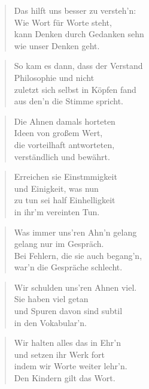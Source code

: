 \documentclass[10pt,a4paper]{article}
\begin{document}
\begin{multicols}{2}
\begin{verse}
Das hilft uns besser zu versteh’n: \\
Wie Wort für Worte steht, \\
kann Denken durch Gedanken sehn \\
wie unser Denken geht. \\
\end{verse}

\begin{verse}
So kam es dann, dass der Verstand \\
Philosophie und nicht \\
zuletzt sich selbst in Köpfen fand \\
aus den’n die Stimme spricht. \\
\end{verse}

\begin{verse}
Die Ahnen damals horteten \\
Ideen von großem Wert, \\
die vorteilhaft antworteten, \\
verständlich und bewährt. \\
\end{verse}

\begin{verse}
Erreichen sie Einstmmigkeit \\
und Einigkeit, was nun \\
zu tun sei half Einhelligkeit \\
in ihr’m vereinten Tun. \\
\end{verse}

\begin{verse}
Was immer uns’ren Ahn’n gelang \\
gelang nur im Gespräch. \\
Bei Fehlern, die sie auch begang’n, \\
war’n die Gespräche schlecht. \\
\end{verse}

\begin{verse}
Wir schulden uns’ren Ahnen viel. \\
Sie haben viel getan \\
und Spuren davon sind subtil \\
in den Vokabular’n. \\
\end{verse}

\begin{verse}
Wir halten alles das in Ehr’n \\
und setzen ihr Werk fort \\
indem wir Worte weiter lehr’n. \\
Den Kindern gilt das Wort. \\
\end{verse}


\end{multicols}
\end{document}
